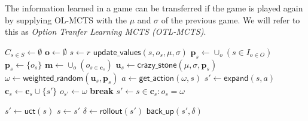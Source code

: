 The information learned in a game can be transferred if the game is played
again by supplying OL-MCTS with the $\mu$ and $\sigma$ of the previous game. We
will refer to this as \emph{Option Tranfer Learning MCTS (OTL-MCTS)}.

\begin{algorithm}
	\caption{$\mathsf{OL-MCTS}(O, r, t, d, v, \mu, \sigma)$}
	\label{alg:olmcts}
	\begin{algorithmic}[1]
		\State $C_{s \in S} \gets \emptyset$
		\State $\mathbf{o} \gets \emptyset$
		 \label{alg:olmcts:mainloop}
			\State $s \gets r$
			 \label{alg:olmcts:innerloop}
				 \label{alg:olmcts:sp}
					\State $\mathsf{update\_values}(s, o_s, \mu, \sigma)$ 
					\State $\mathbf{p}_s \gets \cup_o (s \in I_{o \in O})$
				\Else
					\State $\mathbf{p}_s \gets \{o_s\}$
				\EndIf \label{alg:olmcts:scs}
				\State $\mathbf{m} \gets \cup_o (o_{s \in \mathbf{c}_s})$
				 
					\State $\mathbf{u}_s \gets \mathsf{crazy\_stone}(\mu, \sigma, \mathbf{p}_s)$
					\State $\omega \gets \mathsf{weighted\_random}(\mathbf{u}_s, \mathbf{p}_s)$
					 
						\State $a \gets \mathsf{get\_action}(\omega, s)$ 
						\State $s' \gets \mathsf{expand}(s, a)$ 
						\State $\mathbf{c}_s \gets \mathbf{c}_s \cup \{s'\}$
						\State $o_{s'} \gets \omega$
						\State \textbf{break}
					\Else
						\State $s' \gets s \in \mathbf{c}_s : o_s = \omega$
					\EndIf

				\Else \Comment{Apply \textsf{uct}}
					\State $s' \gets \mathsf{uct}(s)$ \label{alg:olmcts:uct}
				\EndIf \label{alg:olmcts:ecs}
				\State $s \gets s'$ \label{alg:olmcts:ss}
			\EndWhile
			\State $\delta \gets \mathsf{rollout}(s')$ \label{alg:olmcts:rollout}
			\State $\mathsf{back\_up}(s', \delta)$ \label{alg:olmcts:backup}
		\EndWhile
	\end{algorithmic}
\end{algorithm}
